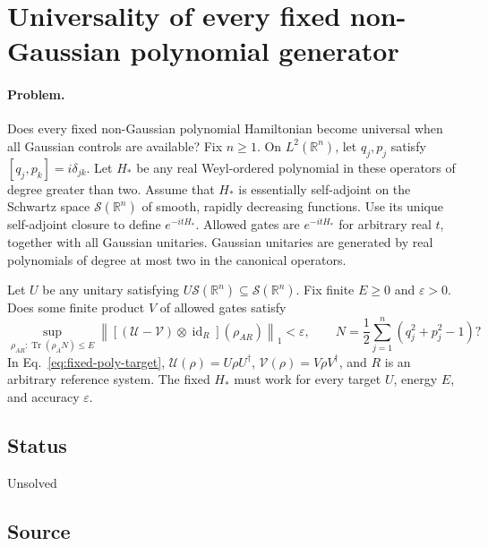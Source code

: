 \section{Universality of every fixed non-Gaussian polynomial generator}
\label{sec:op_64046727b81b4024}

\paragraph{Problem.}
Does every fixed non-Gaussian polynomial Hamiltonian become universal when all Gaussian controls are available?
Fix $n\geq1$.
On $L^2(\mathbb R^n)$, let $q_j,p_j$ satisfy $[q_j,p_k]=i\delta_{jk}$.
Let $H_*$ be any real Weyl-ordered polynomial in these operators of degree greater than two.
Assume that $H_*$ is essentially self-adjoint on the Schwartz space $\mathcal S(\mathbb R^n)$ of smooth, rapidly decreasing functions.
Use its unique self-adjoint closure to define $e^{-itH_*}$.
Allowed gates are $e^{-itH_*}$ for arbitrary real $t$, together with all Gaussian unitaries.
Gaussian unitaries are generated by real polynomials of degree at most two in the canonical operators.

Let $U$ be any unitary satisfying $U\mathcal S(\mathbb R^n)\subseteq\mathcal S(\mathbb R^n)$.
Fix finite $E\geq0$ and $\varepsilon>0$.
Does some finite product $V$ of allowed gates satisfy
\begin{equation}
 \sup_{\rho_{AR}:\operatorname{Tr}(\rho_A N)\leq E}
 \left\|[(\mathcal U-\mathcal V)\otimes\operatorname{id}_R](\rho_{AR})\right\|_1
 <\varepsilon,
 \qquad N=\frac12\sum_{j=1}^n(q_j^2+p_j^2-1)?
 \label{eq:fixed-poly-target}
\end{equation}
In Eq.~\eqref{eq:fixed-poly-target}, $\mathcal U(\rho)=U\rho U^\dagger$, $\mathcal V(\rho)=V\rho V^\dagger$, and $R$ is an arbitrary reference system.
The fixed $H_*$ must work for every target $U$, energy $E$, and accuracy $\varepsilon$.

\subsection*{Status}

Unsolved

\subsection*{Source}

